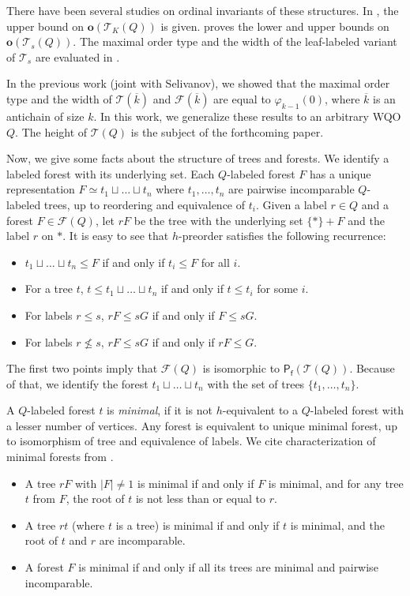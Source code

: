 \documentclass[runningheads]{llncs}
\let \leq \leqslant
\let \nleq \nleqslant
\let \phi \varphi
\renewcommand \S [1][]{\mathsf{P_f^{#1}}}
\def \T {\mathcal{T}}
\def \F {\mathcal{F}}
\def \o {\textbf{o}}
\begin{document}
There have been several studies on ordinal invariants of these structures. In \cite{Schmidt2020}, the upper bound on $\o(\T_K(Q))$ is given. \cite{Friedman2023} proves the lower and upper bounds on $\o(\T_s(Q))$. The maximal order type and the width of the leaf-labeled variant of $\T_s$ are evaluated in \cite{Chopra2026}.

In the previous work \cite{Selivanov2025} (joint with Selivanov), we showed that the maximal order type and the width of $\T\left(\overline{k}\right)$ and $\F\left(\overline{k}\right)$ are equal to $\phi_{k-1}(0)$, where $\overline{k}$ is an antichain of size $k$. In this work, we generalize these results to an arbitrary WQO $Q$. The height of $\T(Q)$ is the subject of the forthcoming paper.

Now, we give some facts about the structure of trees and forests. We identify a labeled forest with its underlying set. Each $Q$-labeled forest $F$ has a unique representation $F \simeq t_1 \sqcup \dots \sqcup t_n$ where $t_1,\dots,t_n$ are pairwise incomparable $Q$-labeled trees, up to reordering and equivalence of $t_i$. Given a label $r \in Q$ and a forest $F \in \F(Q)$, let $rF$ be the tree with the underlying set $\{*\}+F$ and the label $r$ on $*$. It is easy to see that $h$-preorder satisfies the following recurrence:

\begin{lemma}
    \begin{itemize}
        \item $t_1 \sqcup \dots \sqcup t_n \leq F$ if and only if $t_i \leq F$ for all $i$.
        \item For a tree $t$, $t \leq t_1 \sqcup \dots \sqcup t_n$ if and only if $t \leq t_i$ for some $i$.
        \item For labels $r \leq s$, $r F \leq s G$ if and only if $F \leq s G$.
        \item For labels $r \nleq s$, $r F \leq s G$ if and only if $r F \leq G$.
    \end{itemize}
\end{lemma}

The first two points imply that $\F(Q)$ is isomorphic to $\S(\T(Q))$. Because of that, we identify the forest $t_1 \sqcup \dots \sqcup t_n$ with the set of trees $\{t_1, \dots, t_n\}$.

A $Q$-labeled forest $t$ is \textit{minimal}, if it is not $h$-equivalent to a $Q$-labeled forest with a lesser number of vertices. Any forest is equivalent to unique minimal forest, up to isomorphism of tree and equivalence of labels. We cite characterization of minimal forests from \cite{Selivanov2011}.
\begin{itemize}
    \item A tree $rF$ with $|F| \neq 1$ is minimal if and only if $F$ is minimal, and for any tree $t$ from $F$, the root of $t$ is not less than or equal to $r$.
    \item A tree $rt$ (where $t$ is a tree) is minimal if and only if $t$ is minimal, and the root of $t$ and $r$ are incomparable.
    \item A forest $F$ is minimal if and only if all its trees are minimal and pairwise incomparable.
\end{itemize}
\end{document}
